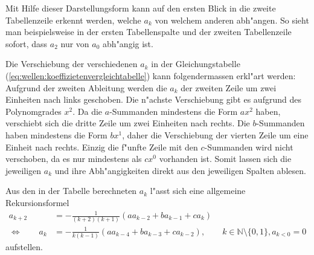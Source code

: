 Mit Hilfe dieser Darstellungsform kann auf den ersten Blick in die zweite 
Tabellenzeile erkennt werden, welche $a_k$ von welchem anderen abh"angen. So 
sieht man beispielsweise in der ersten Tabellenspalte und der zweiten 
Tabellenzeile sofort, dass $a_2$ nur von $a_0$ abh"angig ist.

Die Verschiebung der verschiedenen $a_k$ in der Gleichungstabelle 
(\ref{eq:wellen:koeffizietenvergleichtabelle}) kann folgendermassen erkl"art 
werden: Aufgrund der zweiten Ableitung werden die $a_k$ der zweiten Zeile um 
zwei Einheiten nach links geschoben. Die n"achste Verschiebung gibt es aufgrund 
des Polynomgrades $x^2$. Da die $a$-Summanden mindestens die Form $ax^2$ haben, 
verschiebt sich die dritte Zeile um zwei Einheiten nach rechts. Die 
$b$-Summanden haben mindestens die Form $bx^1$, daher die Verschiebung der 
vierten Zeile um eine Einheit nach rechts. Einzig die f"unfte Zeile mit den 
$c$-Summanden wird nicht verschoben, da es nur mindestens als $cx^0$ vorhanden 
ist. Somit lassen sich die jeweiligen $a_k$ und 
ihre Abh"angigkeiten direkt aus den jeweiligen Spalten ablesen.

Aus den in der Tabelle berechneten $a_k$ l"asst sich eine allgemeine 
Rekursionsformel
\begin{equation*}
	\begin{split}
		a_{k+2} &= -\frac{1}{(k+2)(k+1)} (aa_{k-2}+ba_{k-1}+ca_k) \\
		\Leftrightarrow \qquad
		a_k &= -\frac{1}{k(k-1)} (aa_{k-4}+ba_{k-3}+ca_{k-2}), \qquad k \in 
		\mathbb{N} \setminus \{0, 1\}, a_{k<0} = 0
	\end{split}
\end{equation*}
aufstellen.